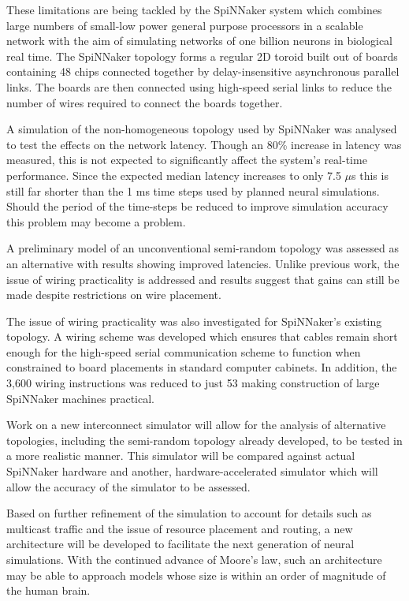 	These limitations are being tackled by the SpiNNaker system which combines
	large numbers of small-low power general purpose processors in a scalable
	network with the aim of simulating networks of one billion neurons in
	biological real time. The SpiNNaker topology forms a regular 2D toroid built
	out of boards containing 48 chips connected together by delay-insensitive
	asynchronous parallel links. The boards are then connected using high-speed
	serial links to reduce the number of wires required to connect the boards
	together.
	
	A simulation of the non-homogeneous topology used by SpiNNaker was analysed to
	test the effects on the network latency. Though an 80\% increase in latency
	was measured, this is not expected to significantly affect the system's
	real-time performance. Since the expected median latency increases to only 7.5
	$\mu$s this is still far shorter than the 1 ms time steps used by planned
	neural simulations. Should the period of the time-steps be reduced to improve
	simulation accuracy this problem may become a problem.
	
	A preliminary model of an unconventional semi-random topology was assessed as
	an alternative with results showing improved latencies. Unlike previous work,
	the issue of wiring practicality is addressed and results suggest that gains
	can still be made despite restrictions on wire placement.
	
	The issue of wiring practicality was also investigated for SpiNNaker's
	existing topology. A wiring scheme was developed which ensures that cables
	remain short enough for the high-speed serial communication scheme to function
	when constrained to board placements in standard computer cabinets. In
	addition, the 3,600 wiring instructions was reduced to just 53 making
	construction of large SpiNNaker machines practical.
	
	Work on a new interconnect simulator will allow for the analysis of
	alternative topologies, including the semi-random topology already developed,
	to be tested in a more realistic manner. This simulator will be compared
	against actual SpiNNaker hardware and another, hardware-accelerated simulator
	which will allow the accuracy of the simulator to be assessed.
	
	Based on further refinement of the simulation to account for details such as
	multicast traffic and the issue of resource placement and routing, a new
	architecture will be developed to facilitate the next generation of neural
	simulations. With the continued advance of Moore's law, such an architecture
	may be able to approach models whose size is within an order of magnitude of
	the human brain.
